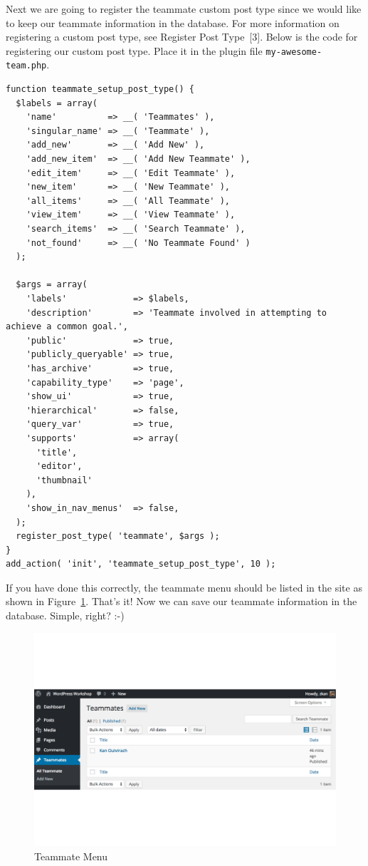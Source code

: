 \documentclass{article}
\begin{document}
\noindent Next we are going to register the teammate custom post type since we
would like to keep our teammate information in the database. For more
information on registering a custom post type, see Register Post Type~[3].
Below is the code for registering our custom post type. Place it in the plugin
file {\tt my-awesome-team.php}.

\begin{verbatim}
function teammate_setup_post_type() {
  $labels = array(
    'name'          => __( 'Teammates' ),
    'singular_name' => __( 'Teammate' ),
    'add_new'       => __( 'Add New' ),
    'add_new_item'  => __( 'Add New Teammate' ),
    'edit_item'     => __( 'Edit Teammate' ),
    'new_item'      => __( 'New Teammate' ),
    'all_items'     => __( 'All Teammate' ),
    'view_item'     => __( 'View Teammate' ),
    'search_items'  => __( 'Search Teammate' ),
    'not_found'     => __( 'No Teammate Found' )
  );

  $args = array(
    'labels'             => $labels,
    'description'        => 'Teammate involved in attempting to achieve a common goal.',
    'public'             => true,
    'publicly_queryable' => true,
    'has_archive'        => true,
    'capability_type'    => 'page',
    'show_ui'            => true,
    'hierarchical'       => false,
    'query_var'          => true,
    'supports'           => array(
      'title',
      'editor',
      'thumbnail'
    ),
    'show_in_nav_menus'  => false,
  );
  register_post_type( 'teammate', $args );
}
add_action( 'init', 'teammate_setup_post_type', 10 );
\end{verbatim}

\noindent If you have done this correctly, the teammate menu should be listed
in the site as shown in Figure~\ref{fig:teammate-menu}. That's it! Now we can
save our teammate information in the database. Simple, right? :-) \\

\begin{figure}[t]
    \centering
    \includegraphics[width=6in]{figures/teammate-menu}
    \caption{Teammate Menu}
    \label{fig:teammate-menu}
\end{figure}
\end{document}
